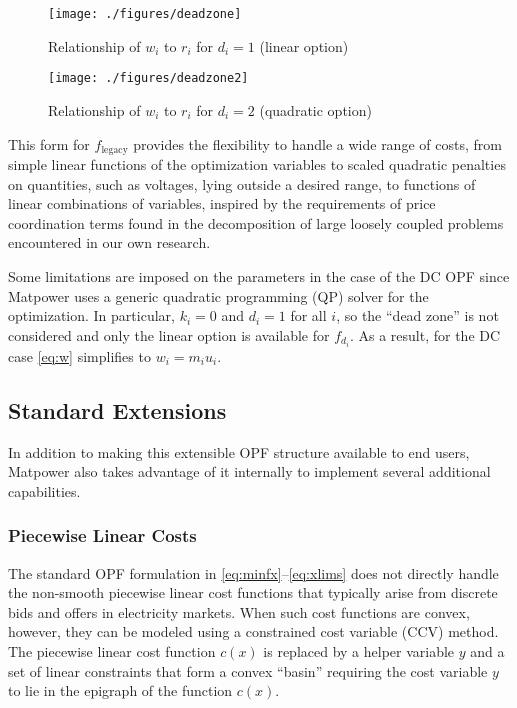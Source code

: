 \documentclass[12pt]{article}
\newcommand{\matpower}[0]{{\sc Matpower}}
\numberwithin{equation}{section}
\numberwithin{table}{section}
\numberwithin{figure}{section}
\begin{document}
\begin{itemize}
\begin{figure}[hbtp]
  \centering
  \texttt{[image: ./figures/deadzone]}
  \caption{Relationship of $w_i$ to $r_i$ for $d_i = 1$ (linear option)}
  \label{fig:deadzone}
\end{figure}

\begin{figure}[hbtp]
  \centering
  \texttt{[image: ./figures/deadzone2]}
  \caption{Relationship of $w_i$ to $r_i$ for $d_i = 2$ (quadratic option)}
  \label{fig:deadzone2}
\end{figure}

This form for $f_\mathrm{legacy}$ provides the flexibility to handle a wide range of costs, from simple linear functions of the optimization variables to scaled quadratic penalties on quantities, such as voltages, lying outside a desired range, to functions of linear combinations of variables, inspired by the requirements of price coordination terms found in the decomposition of large loosely coupled problems encountered in our own research.

Some limitations are imposed on the parameters in the case of the DC OPF since \matpower{} uses a generic quadratic programming (QP) solver for the optimization. In particular, $k_i = 0$ and $d_i = 1$ for all $i$, so the ``dead zone'' is not considered and only the linear option is available for $f_{d_i}$. As a result, for the DC case \eqref{eq:w} simplifies to $w_i = m_i u_i$.
\end{itemize}


\subsection{Standard Extensions}
\label{sec:standard_extensions}

In addition to making this extensible OPF structure available to end users, \matpower{} also takes advantage of it internally to implement several additional capabilities.

\subsubsection{Piecewise Linear Costs}

The standard OPF formulation in \eqref{eq:minfx}--\eqref{eq:xlims} does not directly handle the non-smooth piecewise linear cost functions that typically arise from discrete bids and offers in electricity markets. When such cost functions are convex, however, they can be modeled using a constrained cost variable (CCV) method. The piecewise linear cost function $c(x)$ is replaced by a helper variable $y$ and a set of linear constraints that form a convex ``basin'' requiring the cost variable $y$ to lie in the epigraph of the function $c(x)$.
\end{document}
